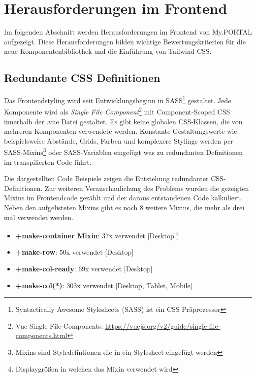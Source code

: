 \chapter{Herausforderungen im Frontend}
\label{cha:Herausforderungen im Frontend}

Im folgenden Abschnitt werden Herausforderungen im Frontend von My.PORTAL aufgezeigt. Diese Herausforderungen bilden wichtige Bewertungskriterien für die neue Komponentenbibliothek und die Einführung von Tailwind CSS.

\section{Redundante CSS Definitionen}
\label{sec:redundantCSS}
Das Frontendstyling wird seit Entwicklungsbeginn in SASS\footnote{ Syntactically Awesome Stylesheets (SASS) ist ein CSS Präprozessor } gestaltet. Jede Komponente wird als \textit{Single File Component}\footnote{ Vue Single File Components: \url{https://vuejs.org/v2/guide/single-file-components.html} } mit Component-Scoped CSS innerhalb der .vue Datei gestaltet. Es gibt keine globalen CSS-Klassen, die von mehreren Komponenten verwendete werden. Konstante Gestaltungswerte wie beispielsweise Abstände, Grids, Farben und komplexere Stylings werden per SASS-Mixins\footnote{ Mixins sind Styledefintionen die in ein Stylesheet eingefügt werden} oder SASS-Variablen eingefügt was zu redundanten Definitionen im transpilierten Code führt. 







Die dargestellten Code Beispiele zeigen die Entstehung redundanter CSS-Definitionen. Zur weiteren Veranschaulichung des Problems wurden die gezeigten Mixins im Frontendcode gezählt und der daraus entstandenen Code kalkuliert. Neben den aufgelisteten Mixins gibt es noch 8 weitere Mixins, die mehr als drei mal verwendet werden.

\begin{itemize}
  \item \textbf{+make-container Mixin}: 37x verwendet [Desktop]\footnote{ Displaygrößen in welchen das Mixin verwendet wird }
  \item \textbf{+make-row}: 50x verwendet [Desktop]
  \item \textbf{+make-col-ready}: 69x verwendet [Desktop]
  \item \textbf{+make-col(*)}: 303x verwendet [Desktop, Tablet, Mobile]
\end{itemize}

